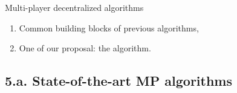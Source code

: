 \documentclass[12pt,english,ignorenonframetext,aspectratio=169,]{beamer}
\providecommand{\tightlist}{%
  \setlength{\itemsep}{0pt}\setlength{\parskip}{0pt}}
\begin{document}
\begin{frame}{Multi-player decentralized algorithms}

\begin{enumerate}
\def\labelenumi{\arabic{enumi}.}
\tightlist
\item
  Common building blocks of previous algorithms,\vspace*{15pt}
\item
  One of our proposal: the \MCTopM{} algorithm.
\end{enumerate}

\end{frame}



\subsection{\hfill{}5.a. State-of-the-art MP algorithms\hfill{}}
\end{document}
